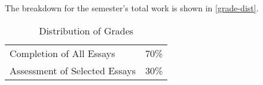 \documentclass[titlepage]{article}
\begin{document}
The breakdown for the semester's total work is shown in
\autoref{grade-dist}.

\begin{table}[htbp]
  \centering
  {\lining
  \begin{tabular}{lr}
    \toprule
    Completion of All Essays      & 70\% \\
    Assessment of Selected Essays & 30\% \\
    \bottomrule
  \end{tabular}}
  \caption{Distribution of Grades}
  \label{grade-dist}
\end{table}

%
%
%
%
%
%
\end{document}
